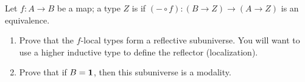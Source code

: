 \begin{ex}
  Let $f:A\to B$ be a map; a type $Z$ is  if $(-\circ f):(B\to Z) \to (A\to Z)$ is an equivalence.
  \begin{enumerate}
  \item Prove that the $f$-local types form a reflective subuniverse.
    You will want to use a higher inductive type to define the reflector (localization).
  \item Prove that if $B=\mathbf{1}$, then this subuniverse is a modality.
  \end{enumerate}
\end{ex}

\egroup

